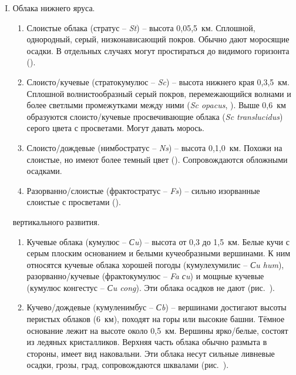 \begin{enumerate}[I.]

\item Облака нижнего яруса.
  \begin{enumerate}[1)]
  \item Слоистые облака (стратус \--- \textit{St}) \--- высота
    0,05,5~км. Сплошной, однородный, серый, низконависающий
    покров. Обычно дают моросящие осадки. В отдельных случаях могут
    простираться до видимого горизонта ().
  \item Слоисто\-/кучевые (стратокумулюс \--- \textit{Sc}) \--- высота
    нижнего края 0,3,5~км. Сплошной волнистообразный серый
    покров, перемежающийся волнами и более светлыми промежутками между
    ними (\textit{Sc opacus}, ). Выше
    0,6~км образуются слоисто\-/кучевые просвечивающие облака
    (\textit{Sc translucidus}) серого цвета с просветами. Могут давать
    морось.
  \item Слоисто\-/дождевые (нимбостратус \--- \textit{Ns}) \--- высота
    0,1,0~км. Похожи на слоистые, но имеют более темный
    цвет (). Сопровождаются обложными осадками.
  \item Разорванно\-/слоистые (фрактостратус \--- \textit{Fs}) \---
    сильно изорванные слоистые с просветами ().
  \end{enumerate}

 вертикального развития.
  \begin{enumerate}[1)]
  \item Кучевые облака (кумулюс \--- \textit{Сu}) \--- высота от 0,3
    до 1,5~км. Белые кучи с серым плоским основанием и белыми
    кучеобразными вершинами. К ним относятся кучевые облака хорошей
    погоды (кумулехумилис \--- \textit{Сu hum}), разорванно\-/кучевые
    (фрактокумулюс \--- \textit{Fa сu}) и мощные кучевые (кумулюс
    конгестус \--- \textit{Сu cong}). Эти облака осадков не дают
    (рис.~).
  \item Кучево\-/дождевые (кумуленимбус \--- \textit{Сb}) \---
    вершинами достигают высоты перистых облаков (6~км),
    походят на горы или высокие башни. Тёмное основание лежит на
    высоте около 0,5~км. Вершины ярко\-/белые, состоят из ледяных
    кристалликов. Верхняя часть облака обычно размыта в стороны, имеет
    вид наковальни. Эти облака несут сильные ливневые осадки, грозы,
    град, сопровождаются шквалами (рис.~).
  \end{enumerate}


\end{enumerate}
